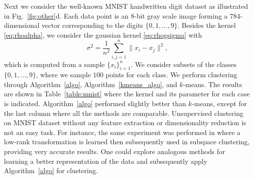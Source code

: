 \documentclass[aps,preprint,nofootinbib,floatfix]{revtex4-1}
\begin{document}
Next we consider 
the well-known MNIST handwritten digit dataset 
as illustrated in Fig.~\ref{fig:other}d.
Each data point is an $8$-bit gray scale
image forming a $784$-dimensional vector 
corresponding to the digits $\{0,1,\dotsc,9 \}$.
Besides the kernel \eqref{eq:rhoalpha}, we
consider the gaussian kernel \eqref{eq:rhogsigma} with 
\begin{equation}
\label{eq:sigma}
\sigma^2 = \dfrac{1}{n^2} \sum_{i,j=1}^n \| x_i - x_j \|^2 ,
\end{equation}
which is computed from a sample  $\{ x_i \}_{i=1}^n$.
We consider subsets of the  classes $\{0,1,\dotsc,9 \}$, 
where we sample $100$ points 
for each class. We perform clustering through 
Algorithm~\ref{algo},
Algorithm~\ref{kmeans_algo}, and $k$-means.
The results are shown in Table~\ref{table:mnist} where the kernel
and its parameter for each case is indicated.
Algorithm~\ref{algo} performed slightly better than $k$-means, except
for the last column where all the methods are comparable. 
Unsupervised clustering on MNIST dataset without any feature extraction
or dimensionality reduction is not an easy task. For instance,
the same experiment was performed in \cite{Sapiro} where a low-rank
transformation is learned then subsequently used in subspace clustering,
providing very accurate results. One could explore analogous methods
for learning a better representation of the data and subsequently apply
Algorithm~\ref{algo} for clustering.
\end{document}
